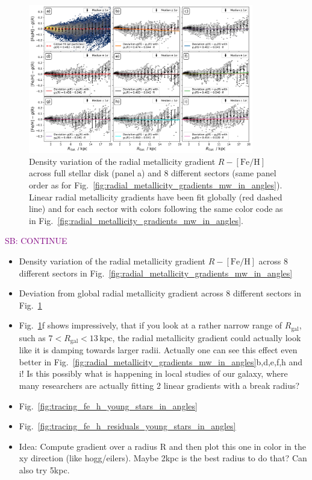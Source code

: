 \documentclass[fleqn,usenatbib]{mnras}
\newcommand{\SB}[1]{{\textcolor{purple}{SB: #1}}}
\begin{document}
\begin{figure}
    \centering
    \includegraphics[width=0.875\textwidth]{figures/linear_radial_metallicity_gradients_mw_in_angles.png}
    \caption{Density variation of the radial metallicity gradient $R-\mathrm{[Fe/H]}$ across full stellar disk (panel a) and 8 different sectors (same panel order as for Fig.~\ref{fig:radial_metallicity_gradients_mw_in_angles}). Linear radial metallicity gradients have been fit globally (red dashed line) and for each sector with colors following the same color code as in Fig.~\ref{fig:radial_metallicity_gradients_mw_in_angles}.}    \label{fig:linear_radial_metallicity_gradients_mw_in_angles}
\end{figure}

\SB{CONTINUE}

\begin{itemize}
    \item Density variation of the radial metallicity gradient $R-\mathrm{[Fe/H]}$ across 8 different sectors in Fig.~\ref{fig:radial_metallicity_gradients_mw_in_angles}
    \item Deviation from global radial metallicity gradient across 8 different sectors in Fig.~\ref{fig:linear_radial_metallicity_gradients_mw_in_angles}
    \item Fig.~\ref{fig:linear_radial_metallicity_gradients_mw_in_angles}f shows impressively, that if you look at a rather narrow range of $R_\mathrm{gal}$, such as $7 < R_\mathrm{gal} < 13\,\mathrm{kpc}$, the radial metallicity gradient could actually look like it is damping towards larger radii. Actually one can see this effect even better in Fig.~\ref{fig:radial_metallicity_gradients_mw_in_angles}b,d,e,f,h and i! Is this possibly what is happening in local studies of our galaxy, where many researchers are actually fitting 2 linear gradients with a break radius?
    \item Fig.~\ref{fig:tracing_fe_h_young_stars_in_angles}
    \item Fig.~\ref{fig:tracing_fe_h_residuals_young_stars_in_angles}
    \item Idea: Compute gradient over a radius R and then plot this one in color in the xy direction (like hogg/eilers). Maybe 2kpc is the best radius to do that? Can also try 5kpc.
\end{itemize}
\end{document}
